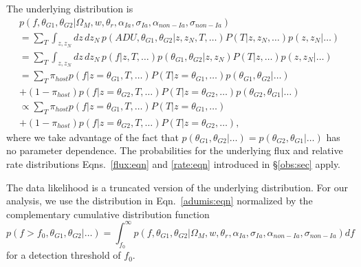 \documentclass[preprint,3p]{elsarticle}
\begin{document}
The underlying distribution is 
\begin{multline}
p(f, \theta_{G1}, \theta_{G2} | \Omega_M, w, \theta_r, \alpha_{Ia},\sigma_{Ia}, \alpha_{\mathit{non-Ia}},\sigma_{\mathit{non-Ia}})  \\
= \sum_{T}\int_{z,z_N} dz\,dz_N \, p(\mathit{ADU, \theta_{G1}, \theta_{G2}}| z , z_N, T, \ldots)P(T| z, z_N,\ldots) p(z, z_N|\ldots)\\
 =\sum_{T} \int_{z,z_N} dz\,dz_N\, p(f| z ,T, \ldots)p(\theta_{G1}, \theta_{G2}| z , z_N) P(T| z, \ldots) p(z, z_N|\ldots)\\
= \sum_{T} \pi_{host} p(f| z=\theta_{G1} ,T, \ldots) P(T| z=\theta_{G1}, \ldots) p(\theta_{G1},\theta_{G2}|\ldots) \\
 +  (1-\pi_{host}) p(f| z=\theta_{G2} ,T, \ldots) P(T| z=\theta_{G2}, \ldots) p(\theta_{G2},
 \theta_{G1}|\ldots)\\
\propto \sum_{T} \pi_{host} p(f| z=\theta_{G1} ,T, \ldots) P(T| z=\theta_{G1}, \ldots) \\
 +  (1-\pi_{host}) p(f| z=\theta_{G2} ,T, \ldots) P(T| z=\theta_{G2}, \ldots),
\label{adumis:eqn}
\end{multline}
where we take advantage of the fact that
$p(\theta_{G1}, \theta_{G2} | \ldots) = p(\theta_{G2}, \theta_{G1} | \ldots)$ has
no parameter dependence.  The probabilities  for the underlying flux and
relative rate distributions
 Eqns.~\ref{flux:eqn} and \ref{rate:eqn} introduced in \S\ref{obs:sec} apply.

The data likelihood is a truncated version of the
underlying distribution.  
For our analysis, we use the distribution in  Eqn.~\ref{adumis:eqn} normalized by
the complementary cumulative distribution function
\begin{equation}
p(f>f_0, \theta_{G1}, \theta_{G2}|\ldots) = \int_{f_0}^{\infty} p(f, \theta_{G1}, \theta_{G2}|\Omega_M, w, \theta_r, \alpha_{Ia},\sigma_{Ia}, \alpha_{\mathit{non-Ia}},\sigma_{\mathit{non-Ia}})df
\end{equation}
for a detection threshold of $f_0$.



\end{document}
